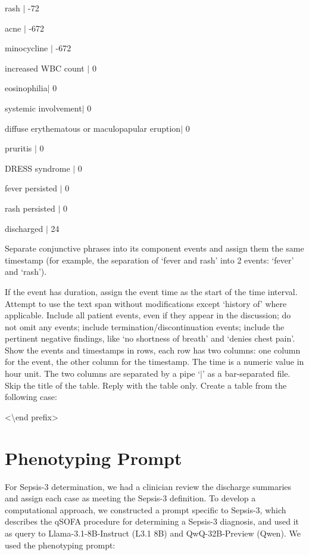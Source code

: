 \documentclass[pmlr,twocolumn,10pt]{jmlr} %
\begin{document}
\begin{tcolorbox}[
  colback=teal!5,
  colframe=teal!70!black,
  title=Textual Time Series Generation Prompt,
  boxrule=2pt,
]
rash $|$ -72\

acne $|$  -672\

minocycline $|$  -672\

increased WBC count $|$ 0\

eosinophilia$|$ 0\

systemic involvement$|$ 0\

diffuse erythematous or maculopapular eruption$|$ 0\

pruritis $|$ 0\

DRESS syndrome $|$ 0\

fever persisted $|$ 0\

rash persisted $|$ 0\

discharged $|$ 24\ 

\color{darkred}
Separate conjunctive phrases into its component events and assign them the same timestamp (for example, the separation of `fever and rash' into 2 events: `fever' and `rash'). 

\color{black} If the event has duration, assign the event time as the start of the time interval. Attempt to use the text span without modifications except `history of' where applicable. Include all patient events, even if they appear in the discussion; do not omit any events; include termination/discontinuation events; include the pertinent negative findings, like `no shortness of breath' and `denies chest pain'.  Show the events and timestamps in rows, each row has two columns: one column for the event, the other column for the timestamp.  The time is a numeric value in hour unit. The two columns are separated by a pipe `$|$' as a bar-separated file. Skip the title of the table. Reply with the table only. Create a table from the following case: 

\textless \textbackslash end prefix\textgreater

\end{tcolorbox}

\clearpage

\section{Phenotyping Prompt}\label{apd:phenotype-prompt}
For Sepsis-3 determination, we had a clinician review the discharge summaries and assign each case as meeting the Sepsis-3 definition.  
To develop a computational approach, we constructed a prompt specific to Sepsis-3, which describes the qSOFA procedure for determining a Sepsis-3 diagnosis, and used it as query to Llama-3.1-8B-Instruct (L3.1 8B) and QwQ-32B-Preview (Qwen).  
We used the phenotyping prompt:
\end{document}
